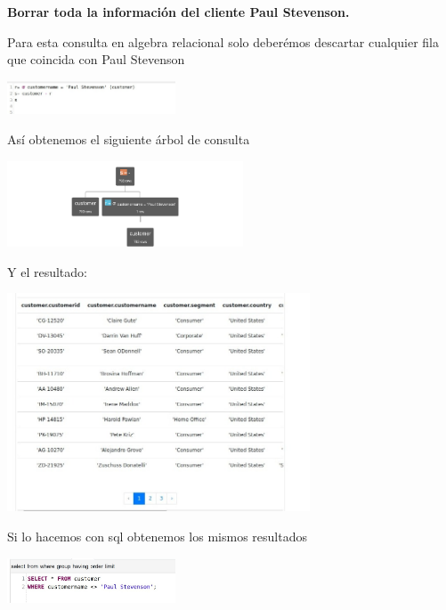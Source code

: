 \textbf{Borrar toda la información del cliente Paul Stevenson.}

Para esta consulta en algebra relacional solo deberémos descartar cualquier fila que coincida con Paul Stevenson

\begin{center}
    \includegraphics[width=5cm]{resources/pregunta2/3.1.1}
\end{center}

Así obtenemos el siguiente árbol de consulta
\begin{center}
    \includegraphics[width=7cm]{resources/pregunta2/3.1.2}
\end{center}
Y el resultado:
\begin{center}
    \includegraphics[width=9cm]{resources/pregunta2/3.1.3}
\end{center}

Si lo hacemos con sql obtenemos los mismos resultados
\begin{center}
    \includegraphics[width=5cm]{resources/pregunta2/3.1.4}
\end{center}
